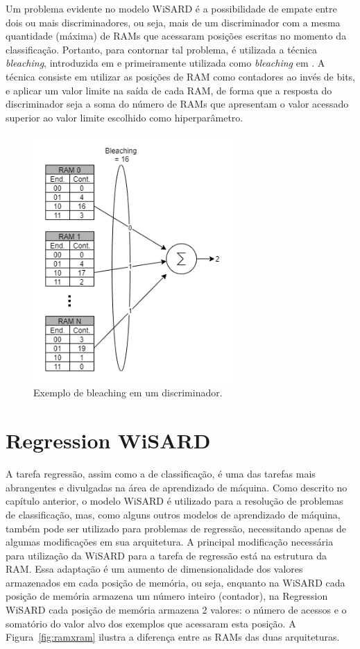     Um problema evidente no modelo WiSARD é a possibilidade de empate entre dois ou mais discriminadores, ou seja, mais de um discriminador com a mesma quantidade (máxima) de RAMs que acessaram posições escritas no momento da classificação. Portanto, para contornar tal problema, é utilizada a técnica \textit{bleaching}, introduzida em \cite{mentalimages} e primeiramente utilizada como \textit{bleaching} em \cite{advanceswns}. A técnica consiste em utilizar as posições de RAM como contadores ao invés de bits, e aplicar um valor limite na saída de cada RAM, de forma que a resposta do discriminador seja a soma do número de RAMs que apresentam o valor acessado superior ao valor limite escolhido como hiperparâmetro.

    \begin{figure}[!ht] \label{fig:bleaching}
    \centering
    \includegraphics[width=3.0in]{img/bleaching.png}
    \caption{Exemplo de bleaching em um discriminador.}
    \end{figure}

\section{Regression WiSARD}
    A tarefa regressão, assim como a de classificação, é uma das tarefas mais abrangentes e divulgadas na área de aprendizado de máquina. Como descrito no capítulo anterior, o modelo WiSARD é utilizado para a resolução de problemas de classificação, mas, como alguns outros modelos de aprendizado de máquina, também pode ser utilizado para problemas de regressão, necessitando apenas de algumas modificações em sua arquitetura.
    A principal modificação necessária para utilização da WiSARD para a tarefa de regressão está na estrutura da RAM. Essa adaptação é um aumento de dimensionalidade dos valores armazenados em cada posição de memória, ou seja, enquanto na WiSARD cada posição de memória armazena um número inteiro (contador), na Regression WiSARD cada posição de memória armazena 2 valores: o número de acessos e o somatório do valor alvo dos exemplos que acessaram esta posição. A Figura~\ref{fig:ramxram} ilustra a diferença entre as RAMs das duas arquiteturas.

